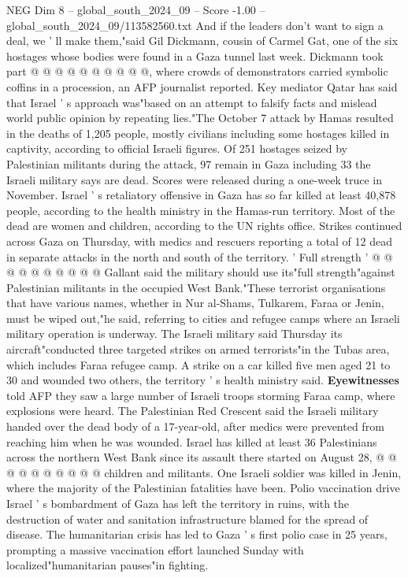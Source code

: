 \begin{textsample}{NEG Dim 8 – global\_south\_2024\_09 – Score -1.00 – global\_south\_2024\_09/113582560.txt}
And if the leaders don't want to sign a deal, we ' ll make them,"said Gil Dickmann, cousin of Carmel Gat, one of the six hostages whose bodies were found in a Gaza tunnel last week.
Dickmann took part @ @ @ @ @ @ @ @ @ @, where crowds of demonstrators carried symbolic coffins in a procession, an AFP journalist reported.
Key mediator Qatar has said that Israel ' s approach was"based on an attempt to falsify facts and mislead world public opinion by repeating lies."The October 7 attack by Hamas resulted in the deaths of 1,205 people, mostly civilians including some hostages killed in captivity, according to official Israeli figures.
Of 251 hostages seized by Palestinian militants during the attack, 97 remain in Gaza including 33 the Israeli military says are dead.
Scores were released during a one-week truce in November.
Israel ' s retaliatory offensive in Gaza has so far killed at least 40,878 people, according to the health ministry in the Hamas-run territory.
Most of the dead are women and children, according to the UN rights office.
Strikes continued across Gaza on Thursday, with medics and rescuers reporting a total of 12 dead in separate attacks in the north and south of the territory. ' Full strength ' @ @ @ @ @ @ @ @ @ @ Gallant said the military should use its"full strength"against Palestinian militants in the occupied West Bank."These terrorist organisations that have various names, whether in Nur al-Shams, Tulkarem, Faraa or Jenin, must be wiped out,"he said, referring to cities and refugee camps where an Israeli military operation is underway.
The Israeli military said Thursday its aircraft"conducted three targeted strikes on armed terrorists"in the Tubas area, which includes Faraa refugee camp.
A strike on a car killed five men aged 21 to 30 and wounded two others, the territory ' s health ministry said. \textbf{Eyewitnesses} told AFP they saw a large number of Israeli troops storming Faraa camp, where explosions were heard.
The Palestinian Red Crescent said the Israeli military handed over the dead body of a 17-year-old, after medics were prevented from reaching him when he was wounded.
Israel has killed at least 36 Palestinians across the northern West Bank since its assault there started on August 28, @ @ @ @ @ @ @ @ @ @ children and militants.
One Israeli soldier was killed in Jenin, where the majority of the Palestinian fatalities have been.
Polio vaccination drive Israel ' s bombardment of Gaza has left the territory in ruins, with the destruction of water and sanitation infrastructure blamed for the spread of disease.
The humanitarian crisis has led to Gaza ' s first polio case in 25 years, prompting a massive vaccination effort launched Sunday with localized"humanitarian pauses"in fighting.

\end{textsample}

